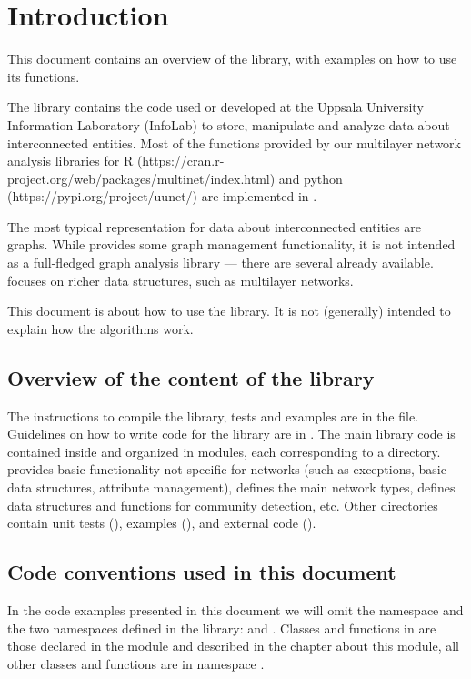 \chapter{Introduction}

This document contains an overview of the  library, with examples on how to use its functions.

The  library contains the code used or developed at the Uppsala University Information Laboratory (InfoLab) to store, manipulate and analyze data about interconnected entities. Most of the functions provided by our multilayer network analysis libraries for R (https://cran.r-project.org/web/packages/multinet/index.html) and python (https://pypi.org/project/uunet/) are implemented in .

The most typical representation for data about interconnected entities are graphs. While  provides some graph management functionality, it is not intended as a full-fledged graph analysis library --- there are several already available.  focuses on richer data structures, such as multilayer networks.

This document is about how to use the library. It is not (generally) intended to explain how the algorithms work.

\section{Overview of the content of the library}

The instructions to compile the library, tests and examples are in the  file. Guidelines on how to write code for the library are in . The main library code is contained inside  and organized in modules, each corresponding to a directory.  provides basic functionality not specific for networks (such as exceptions, basic data structures, attribute management),  defines the main network types,  defines data structures and functions for community detection, etc. Other directories contain unit tests (), examples (), and external code ().

\section{Code conventions used in this document}

In the code examples presented in this document we will omit the  namespace and the two namespaces defined in the library:  and . Classes and functions in  are those declared in the  module and described in the chapter about this module, all other classes and functions are in namespace .
